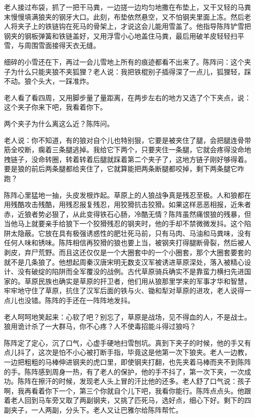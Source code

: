 \par 老人接过布袋，抓了一把干马粪，一边搓一边均匀地撒在布垫上，又干又轻的马粪末慢慢填满狼夹的钢牙大口。此刻，布垫依然悬空，又不怕钢夹里面上冻。然后老人将夹子上的铁链钩在死马的骨架上，才说这会儿能用雪盖了。他指导陈阵铲雪把钢夹的钢板弹簧和铁链盖好，又用浮雪小心地盖住马粪，最后用破羊皮轻轻扫平雪，与周围雪面接得天衣无缝。
\par 细碎的小雪还在下，再过一会儿雪地上所有的痕迹都看不出来了。陈阵问：这个夹子为什么只能夹狼不夹狐狸？老人说：我把铁棍别子插得深了一点儿，狐狸轻，踩不动。狼个头大，一踩准炸。
\par 老人看了看四周，又用脚步量了量距离，在两步左右的地方又选了个下夹点，说：这个夹子你来下吧，我看着你下。
\par 两个夹子为什么离这么近？陈阵问。
\par 老人说：你不知道，有的狼对自个儿也特别狠，它要是被夹住了腿，会把腿连骨带筋全咬断，瘸着三条腿逃掉。我给它下两个，只要夹住一条腿，它就会疼得没命地拽链子，没命转圈，转着转着后腿就踩着第二个夹子了，这地方链子刚好够得着。要是狼的前后两条腿都给夹住了，它就算能把两条断腿都咬掉，剩下两条腿它咋跑？
\par 陈阵心里猛地一抽，头皮发根炸起。草原上的人狼战争真是残忍至极。人和狼都在用残酷攻击残酷，用残忍报复残忍，用狡猾抗击狡猾。如果这样恶恶相报，近朱者赤，近狼者势必狠了，从此变得铁石心肠，冷酷无情？陈阵虽然痛恨狼的残暴，但当他马上就要亲手给狼下一个狡猾残忍的钢夹时，他的手却不禁微微发抖。这个陷阱太隐蔽。它放在具有极强诱惑性的肥壮死马前，只有马肉、马油和马粪味，没有任何人味和锈味。陈阵相信再狡猾的狼也要上当，被钢夹打得腿断骨裂，然后被人剥皮，弃尸荒野。而且这还仅仅是一个大圈套中的一个小圈套，那个大圈套要套的就不是几条狼了。他想起周秦汉唐宋明无数支汉军被诱进草原深处，落入被精心设计、没有破绽的陷阱而全军覆没的战例。古代草原骑兵确实不是靠蛮力横扫先进国家的。草原民族也确实是草原的扞卫者，他们用从狼那里学来的军事才华和智慧，牢牢地守住了草原，抗住了汉军后面的铁与火、锄和犁对草原的进攻，老人说得一点儿也没错。陈阵的手还在一阵阵地发抖。
\par 老人呵呵地笑起来：心软了吧？别忘了，草原是战场，见不得血的人，不是战士。狼用诡计杀了一大群马，你不心疼？人不使毒招能斗得过狼吗？
\par 陈阵定了定心，沉了口气，心虚手硬地扫雪刨坑。真到下夹子的时候，他的手又有点儿抖了，这次是怕不小心被打断手指，毕竟这是他第一次下狼夹。老人一边教，一边把粗粗的马棒伸进钢夹的虎口里，即使钢夹打翻，也先夹着马棒而夹不到陈阵的手。陈阵感到周身一热，有了老人的保护，他的手不抖了，第一次下夹，一次成功。陈阵在擦汗的时候，发现老人头上冒的汗比他的还多。老人舒了口气说：孩子啊，我再看着你下一个，第三个你就自个儿下吧，我看你能行。陈阵点点头。他跟着老人回到马车旁又取了两副钢夹，又挑了匹死马，选好点，细心下好。剩下的四副夹子，一人两副，分头下。老人又让巴雅尔给陈阵帮忙。
